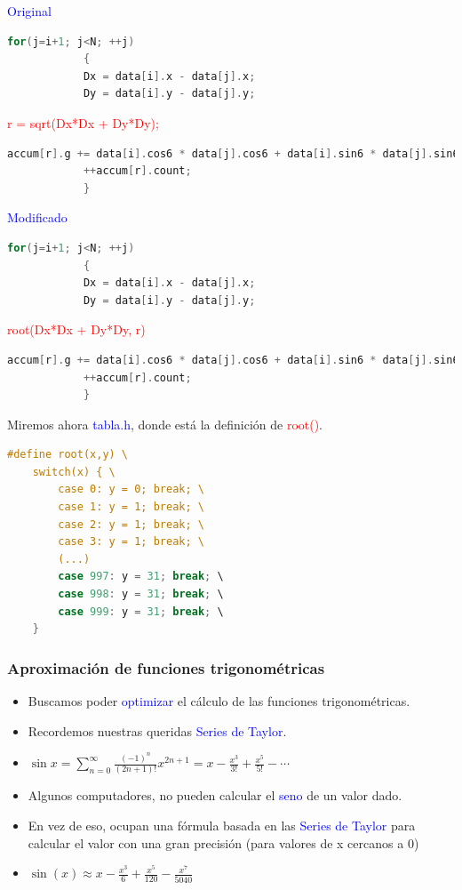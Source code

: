 \documentclass{beamer}
\begin{document}
\begin{frame}[fragile]
		\normalsize
		\textcolor{blue}{Original}
		\tiny
		\begin{lstlisting}[language=C]
			for(j=i+1; j<N; ++j)
			{
			Dx = data[i].x - data[j].x;
			Dy = data[i].y - data[j].y;
		\end{lstlisting}
		\vspace{-0.1cm}
			\textcolor{red}{r = sqrt(Dx*Dx + Dy*Dy);}
		\vspace{-0.1cm}
		\begin{lstlisting}[language=C]
			accum[r].g += data[i].cos6 * data[j].cos6 + data[i].sin6 * data[j].sin6;
			++accum[r].count;
			}
		\end{lstlisting}
		\normalsize
		\textcolor{blue}{Modificado}
		\tiny
		\begin{lstlisting}[language=C]
			for(j=i+1; j<N; ++j)
			{
			Dx = data[i].x - data[j].x;
			Dy = data[i].y - data[j].y;
		\end{lstlisting}
		\vspace{-0.1cm}
			\textcolor{red}{root(Dx*Dx + Dy*Dy, r)}
		\vspace{-0.1cm}
		\begin{lstlisting}[language=C]
			accum[r].g += data[i].cos6 * data[j].cos6 + data[i].sin6 * data[j].sin6;
			++accum[r].count;
			}
		\end{lstlisting}
\end{frame}

\begin{frame}[fragile]
	\normalsize
	Miremos ahora \textcolor{blue}{tabla.h}, donde está la definición de \textcolor{red}{root()}.
	\scriptsize
	\begin{lstlisting}[language=C]
	#define root(x,y) \
	switch(x) { \
		case 0: y = 0; break; \
		case 1: y = 1; break; \
		case 2: y = 1; break; \
		case 3: y = 1; break; \
		(...)
		case 997: y = 31; break; \
		case 998: y = 31; break; \
		case 999: y = 31; break; \
	}
	\end{lstlisting}
\end{frame}

\frame
{
\frametitle{Aproximación de funciones trigonométricas}
	\small
	\begin{itemize}
		\item<1->Buscamos poder \textcolor{blue}{optimizar} el cálculo de las funciones trigonométricas.
		\item<2->Recordemos nuestras queridas \textcolor{blue}{Series de Taylor}.
		\item<3->$\operatorname{sin}{x}= \sum^{\infty}_{n=0} \frac{(-1)^n}{(2n+1)!} x^{2n+1} = x - \frac{x^3}{3!} + \frac{x^5}{5!} - \cdots $
		\item<4->Algunos computadores, no pueden calcular el \textcolor{blue}{seno} de un valor dado.
		\item<5->En vez de eso, ocupan una fórmula basada en las \textcolor{blue}{Series de Taylor} para calcular el valor con una gran precisión (para valores de x cercanos a 0)
		\item<6->$\operatorname{sin}(x) \approx x - \frac{x^3}{6} + \frac{x^5}{120} - \frac{x^7}{5040}$
	\end{itemize}
}
\end{document}
